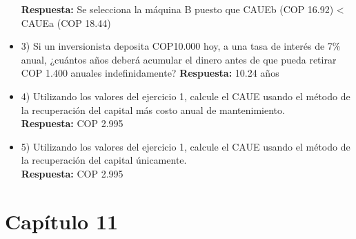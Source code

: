 \begin{itemize}
       \textbf{ Respuesta:} Se selecciona la máquina B puesto que CAUEb (COP 16.92) < CAUEa (COP 18.44)
       \\
 \item 3)  Si un inversionista deposita COP10.000 hoy, a una tasa de interés de 7\% anual, ¿cuántos años deberá acumular el dinero antes de que pueda retirar  COP  1.400 anuales indefinidamente?
       \textbf{ Respuesta:} 10.24 años
       \\
 \item 4)  Utilizando los valores del ejercicio 1, calcule el CAUE usando el método de la recuperación del capital más costo anual de mantenimiento.\\
       \textbf{ Respuesta:} COP 2.995
       \\
 \item 5)  Utilizando los valores del ejercicio 1, calcule el CAUE usando el método de la recuperación del capital únicamente.\\
       \textbf{ Respuesta:} COP 2.995

\end{itemize}

\chapter*{Capítulo 11}

